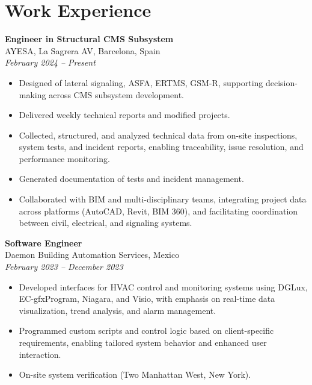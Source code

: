 \documentclass[11pt,a4paper]{article}
\begin{document}
\begin{minipage}[t]{0.65\textwidth}
\justifying

\vspace*{-14.5em}

\section*{Work Experience}
\footnotesize

\textbf{Engineer in Structural CMS Subsystem} \\
AYESA, La Sagrera AV, Barcelona, Spain \\
\textit{February 2024 -- Present}
\begin{itemize}
    \item Designed of lateral signaling, ASFA, ERTMS, GSM-R, supporting decision-making across CMS subsystem development.
    \item Delivered weekly technical reports and modified projects.
    \item Collected, structured, and analyzed technical data from on-site inspections, system tests, and incident reports, enabling traceability, issue resolution, and performance monitoring.
    \item Generated documentation of tests and incident management.
    \item Collaborated with BIM and multi-disciplinary teams, integrating project data across platforms (AutoCAD, Revit, BIM 360), and facilitating coordination between civil, electrical, and signaling systems.
\end{itemize}

\vspace{1em}

\textbf{Software Engineer} \\
Daemon Building Automation Services, Mexico \\
\textit{February 2023 -- December 2023}
\begin{itemize}
    \item Developed interfaces for HVAC control and monitoring systems using DGLux, EC-gfxProgram, Niagara, and Visio, with emphasis on real-time data visualization, trend analysis, and alarm management.
    \item Programmed custom scripts and control logic based on client-specific requirements, enabling tailored system behavior and enhanced user interaction.
    \item On-site system verification (Two Manhattan West, New York).
\end{itemize}


\end{minipage}
\end{document}

